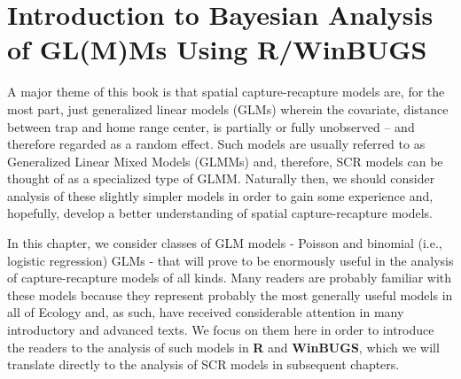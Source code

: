 \chapter{
Introduction to Bayesian Analysis of GL(M)Ms Using R/WinBUGS
}
\label{chapt.intro}

\vspace{.3in}


A major theme of this book is that spatial capture-recapture models
are, for the most part, just generalized linear models (GLMs) wherein
the covariate, distance between trap and home range center, is
partially or fully unobserved  -- and therefore regarded as 
a random effect. Such models
are usually referred to as Generalized Linear Mixed Models (GLMMs)
and, therefore, SCR models can be thought of as a specialized type of
GLMM. Naturally then, we should consider analysis of these slightly
simpler models in order to gain some experience and, hopefully,
develop a better understanding of spatial capture-recapture models.

In this chapter, we consider classes of GLM models - Poisson and
binomial (i.e., logistic regression) GLMs - that will prove to be
enormously useful in the analysis of capture-recapture models of all
kinds. Many readers are probably familiar with these models because
they represent probably 
the most generally useful models in all of Ecology and, as
such, have received considerable attention in many introductory and
advanced texts. We focus on them here in order to introduce the
readers to the analysis of such models in {\bf R} and {\bf WinBUGS}, 
which we will
translate directly to the analysis of SCR models in subsequent
chapters.  


